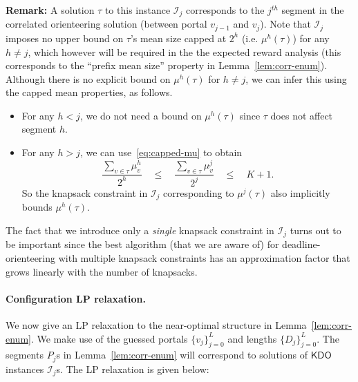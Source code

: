 \documentclass[11pt,letterpaper]{article}
\numberwithin{algorithm}{section}
\newcommand{\I}{{\mathcal{I}}}
\newcommand{\kdo}{\ensuremath{\mathsf{KDO}}\xspace}
\begin{document}
{\bf Remark:} A solution $\tau$ to this instance $\I_j$ corresponds to the $j^{th}$ segment in the correlated orienteering solution (between portal $v_{j-1}$ and $v_j$). Note that $\I_j$ imposes no upper bound on
$\tau$'s mean size capped at $2^h$ (i.e. $\mu^h(\tau)$) for any $h\ne j$, which however will be required in the the expected reward analysis (this corresponds to the ``prefix mean size'' property
in Lemma~\ref{lem:corr-enum}). Although there is no explicit bound on $\mu^h(\tau)$ for $h\ne j$, we can infer this using the capped mean properties, as follows.
\begin{itemize}
\item For any $h<j$, we do not need a bound on $\mu^h(\tau)$ since $\tau$ does not affect segment $h$.
\item For any  $h>j$, we can use~\eqref{eq:capped-mu} to obtain
$$\frac{\sum_{v\in \tau} \mu^{h}_v}{2^{h}} \quad \le \quad \frac{\sum_{v\in \tau} \mu^{j}_v}{2^{j}}\quad \le \quad K+1.$$
So the knapsack constraint in $\I_j$ corresponding to $\mu^j(\tau)$ also implicitly bounds $\mu^h(\tau)$.
\end{itemize}
The fact that we introduce only a {\em single} knapsack constraint in $\I_j$ turns out to be important since the best algorithm (that we are aware of) for deadline-orienteering with multiple knapsack constraints has an approximation factor that grows linearly with the number of knapsacks.

\paragraph{Configuration LP relaxation.} We now give an LP
relaxation to the near-optimal structure in Lemma~\ref{lem:corr-enum}. We make use of the guessed portals $\{v_j\}_{j=0}^L$ and lengths $\{D_j\}_{j=0}^L$. The segments $P_j$s in Lemma~\ref{lem:corr-enum} will correspond to solutions of \kdo instances $\I_j$s. The LP relaxation is given below:
\end{document}
